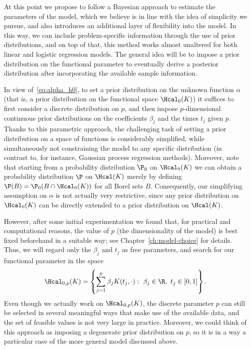 At this point we propose to follow a Bayesian approach to estimate the parameters of the model, which we believe is in line with the idea of simplicity we pursue, and also introduces an additional layer of flexibility into the model. In this way, we can include problem-specific information through the use of prior distributions, and on top of that, this method works almost unaltered for both linear and logistic regression models. The general idea will be to impose a prior distribution on the functional parameter to eventually derive a posterior distribution after incorporating the available sample information.

In view of~\eqref{eq:alpha_h0}, to set a prior distribution on the unknown function \(\alpha\) (that is, a prior distribution on the functional space \(\Hcal_0(K)\)) it suffices to first consider a discrete distribution on \(p\), and then impose \(p\)-dimensional continuous prior distributions on the coefficients \(\beta_j\) and the times \(t_j\) given \(p\). Thanks to this parametric approach, the challenging task of setting a prior distribution on a space of functions is considerably simplified, while simultaneously not constraining the model to any specific distribution (in contrast to, for instance, Gaussian process regression methods). Moreover, note that starting from a probability distribution \(\P_0\) on \(\Hcal_0(K)\) we can obtain a probability distribution \(\P\) on \(\Hcal(K)\) merely by defining \(\P(B) = \P_0(B\cap \Hcal_0(K))\) for all Borel sets \(B\). Consequently, our simplifying assumption on \(\alpha\) is not actually very restrictive, since any prior distribution on \(\Hcal_0(K)\) can be directly extended to a prior distribution on \(\Hcal(K)\).

However, after some initial experimentation we found that, for practical and computational reasons, the value of \(p\) (the dimensionality of the model) is best fixed beforehand in a suitable way; see Chapter~\ref{ch:model-choice} for details. Thus, we will regard only the \(\beta_j\) and \(t_j\) as free parameters, and search for our functional parameter in the space
\begin{equation}\label{eq:h0p}
\Hcal_{0,p}(K)=\left\{ \sum_{j=1}^p \beta_j K(t_j, \cdot): \ \beta_j \in \R, \ t_j \in [0, 1]\right\}.
\end{equation}
Even though we actually work on \(\Hcal_{0,p}(K)\), the discrete parameter \(p\) can still be selected in several meaningful ways that make use of the available data, and the set of feasible values is not very large in practice. Moreover, we could think of this approach as imposing a degenerate prior distribution on \(p\), so it is in a way a particular case of the more general model discussed above.

